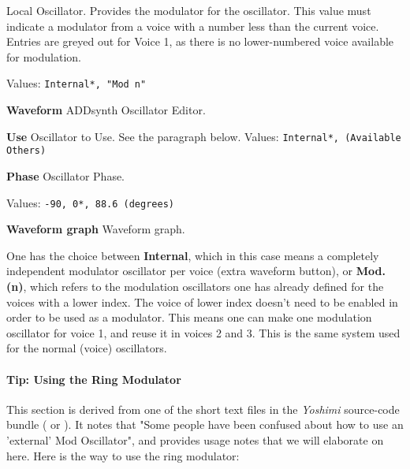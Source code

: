    Local Oscillator.
   Provides the modulator for the oscillator.
   This value must indicate a modulator from a voice with a number less than
   the current voice. Entries are greyed out for Voice 1, as there is no
   lower-numbered voice available for modulation.

   Values: \texttt{Internal*, "Mod n"}

   \begin{enumber}
      \item \textbf{Waveform}
         ADDsynth Oscillator Editor.
      \item \textbf{Use}
         Oscillator to Use.
         See the paragraph below.
         Values: \texttt{Internal*, (Available Others)}
      \item \textbf{Phase}
         Oscillator Phase.

         Values: \texttt{-90, 0*, 88.6 (degrees)}
      \item \textbf{Waveform graph}
         Waveform graph.
   \end{enumber}

   One has the choice between \textbf{Internal}, which in this case means a
   completely independent modulator oscillator per voice (extra waveform button),
   or \textbf{Mod. (n)}, which refers to the modulation oscillators one has
   already defined for the voices with a lower index.
   The voice of lower index doesn't need to be enabled in order to be used as a
   modulator. This means one can make one modulation oscillator for voice 1, and
   reuse it in voices 2 and 3.  This is the same system used for the normal (voice)
   oscillators.

\paragraph{Tip: Using the Ring Modulator}
\label{paragraph:tips_using_the_ring_modulator}

   This section is derived from one of the short text files in the
   \textsl{Yoshimi} source-code bundle (\cite{yoshimi} or \cite{yoshimi2}).
   It notes that "Some people have
   been confused about how to use an 'external' Mod Oscillator", and
   provides usage notes that we will elaborate on here.  Here is the way to
   use the ring modulator:

